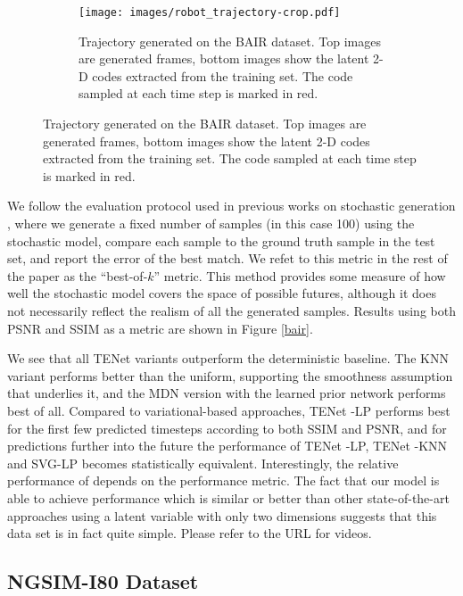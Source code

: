 \documentclass{article}
\newcommand{\modelname}{TENet }
\begin{document}
\begin{figure}
  \centering
  \begin{subfigure}[b]{\textwidth}
    \centering
  \texttt{[image: images/robot\_trajectory-crop.pdf]}
  \caption{Trajectory generated on the BAIR dataset. Top images are generated frames, bottom images show the latent 2-D codes extracted from the training set. The code sampled at each time step is marked in red.}
    \label{robot-trajectory}
  \end{subfigure}
\end{figure}



We follow the evaluation protocol used in previous works on stochastic generation \citep{Walker2016, Babaeizadeh2018, Denton2018}, where we generate a fixed number of samples (in this case 100) using the stochastic model, compare each sample to the ground truth sample in the test set, and report the error of the best match. We refet to this metric in the rest of the paper as the ``best-of-$k$'' metric.
This method provides some measure of how well the stochastic model covers the space of possible futures, although it does not necessarily reflect the realism of all the generated samples.
Results using both PSNR and SSIM \citep{SSIM} as a metric are shown in Figure \ref{bair}.

We see that all \modelname variants outperform the deterministic baseline.
The KNN variant performs better than the uniform, supporting the smoothness assumption that underlies it, and the MDN version with the learned prior network performs best of all.
Compared to variational-based approaches, \modelname-LP performs best for the first few predicted timesteps according to both SSIM and PSNR, and for predictions further into the future the performance of \modelname-LP, \modelname-KNN and SVG-LP becomes statistically equivalent.  Interestingly, the relative performance of \citep{Babaeizadeh2018} depends on the performance metric.
The fact that our model is able to achieve performance which is similar or better than other state-of-the-art approaches using a latent variable with only two dimensions suggests that this data set is in fact quite simple.
Please refer to the URL for videos.


\subsection{NGSIM-I80 Dataset}
\end{document}
